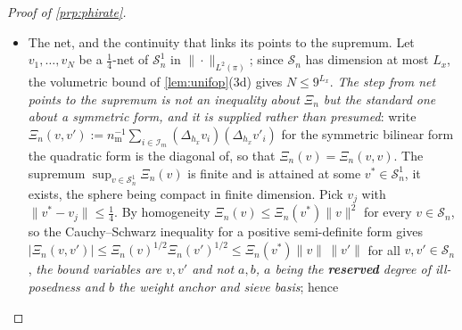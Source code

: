 \begin{proof}[Proof of \cref{prp:phirate}]
\begin{itemize}
$\mathsf c_{18}:=3\mathsf K\big/\big(8(4c_C\mathsf c_2\mathsf c_{11})^{2}\big)>0$. The exponent is
linear in $n_{\mathrm m}/L_x$; \cref{lem:bdiff}(i) would give $n_{\mathrm m}/L_x^{2}$, and Markov would
give a reciprocal. $\mathsf c_{18}$ is declared in place here, is used at four lines of this step,
and is \textbf{carried} only within this step --- but it is \textbf{not named} only here.
\textup{(g)}'s note reads it as the one quantity of its accounting that is
\emph{invariant} in $(\mathsf c_2,\|\bar\Theta\|_{L^{1}})$ and computes its closed form; the note on
the constants that follows repeats the ruling; and C3's own notes in the assumption block make the
same point about it. \emph{No claim of exhaustiveness is made, and that is deliberate}: the draft
this sentence replaces read ``at no other line of any file'' and was short by four printed lines,
two of which compute the constant.
\item[--] The net, and the continuity that links its points to the supremum. Let
$v_1,\dots,v_N$ be a $\tfrac14$-net of $\mathcal S^{1}_n$ in $\|\cdot\|_{L^{2}(\pi)}$; since
$\mathcal S_n$ has dimension at most $L_x$, the volumetric bound of \cref{lem:unifop}(3d) gives
$N\le9^{L_x}$. \emph{The step from net points to the supremum is not an inequality about $\varXi_n$ but
the standard one about a symmetric form, and it is supplied rather than presumed}: write
$\varXi_n(v,v'):=n_{\mathrm m}^{-1}\sum_{i\in\mathcal I_m}(\Delta_{h_x}v_i)(\Delta_{h_x}v'_i)$ for the
symmetric bilinear form the quadratic form is the diagonal of, so that $\varXi_n(v)=\varXi_n(v,v)$. The
supremum $\sup_{v\in\mathcal S^{1}_n}\varXi_n(v)$ is finite and is attained at some
$v^\ast\in\mathcal S^{1}_n$, it exists, the sphere being compact in finite dimension. Pick $v_j$ with
$\|v^\ast-v_j\|\le\tfrac14$. By homogeneity $\varXi_n(v)\le\varXi_n(v^\ast)\|v\|^{2}$ for every
$v\in\mathcal S_n$, so the Cauchy--Schwarz inequality for a positive semi-definite form gives
$|\varXi_n(v,v')|\le\varXi_n(v)^{1/2}\varXi_n(v')^{1/2}\le\varXi_n(v^\ast)\|v\|\,\|v'\|$ for all
$v,v'\in\mathcal S_n$, \emph{the bound variables are $v,v'$ and not $a,b$, $a$ being the
\textbf{reserved} degree of ill-posedness and $b$ the weight anchor and sieve basis}; hence

\end{itemize}
\end{proof}

